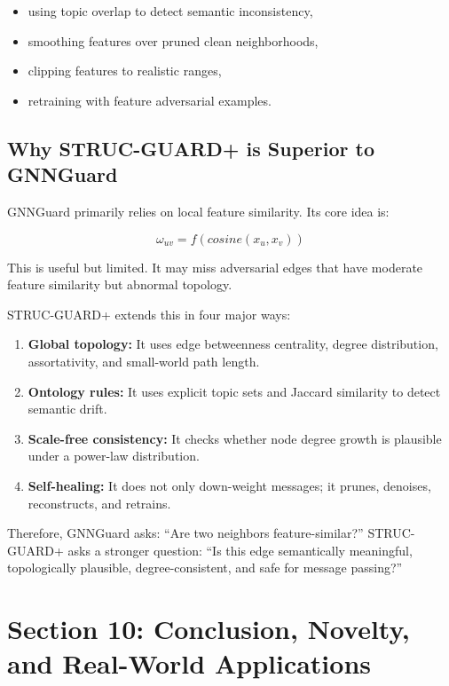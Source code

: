 \documentclass[12pt,a4paper]{article}
\begin{document}
\begin{itemize}
    \item using topic overlap to detect semantic inconsistency,
    \item smoothing features over pruned clean neighborhoods,
    \item clipping features to realistic ranges,
    \item retraining with feature adversarial examples.
\end{itemize}

\subsection{Why STRUC-GUARD+ is Superior to GNNGuard}
GNNGuard primarily relies on local feature similarity. Its core idea is:

$$
\omega_{uv}=f(cosine(x_u,x_v))
$$

This is useful but limited. It may miss adversarial edges that have moderate feature similarity but abnormal topology.

STRUC-GUARD+ extends this in four major ways:

\begin{enumerate}
    \item \textbf{Global topology:} It uses edge betweenness centrality, degree distribution, assortativity, and small-world path length.
    \item \textbf{Ontology rules:} It uses explicit topic sets and Jaccard similarity to detect semantic drift.
    \item \textbf{Scale-free consistency:} It checks whether node degree growth is plausible under a power-law distribution.
    \item \textbf{Self-healing:} It does not only down-weight messages; it prunes, denoises, reconstructs, and retrains.
\end{enumerate}

Therefore, GNNGuard asks: ``Are two neighbors feature-similar?'' STRUC-GUARD+ asks a stronger question: ``Is this edge semantically meaningful, topologically plausible, degree-consistent, and safe for message passing?''

\section{Section 10: Conclusion, Novelty, and Real-World Applications}
\end{document}
